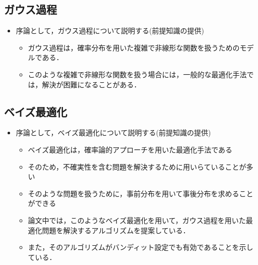 \documentclass[dvipdfmx, 10.5pt]{beamer}
\begin{document}

\subsection{ガウス過程}
\begin{frame}{\insertsubsection}
	\begin{itemize}
		\item 序論として，ガウス過程について説明する(前提知識の提供)
		\begin{itemize}
			\item ガウス過程は，確率分布を用いた複雑で非線形な関数を扱うためのモデルである．
			\item このような複雑で非線形な関数を扱う場合には，一般的な最適化手法では，解決が困難になることがある．
		\end{itemize}
	\end{itemize}


\end{frame}
\subsection{ベイズ最適化}
\begin{frame}{\insertsubsection}
	\begin{itemize}
		\item 序論として，ベイズ最適化について説明する(前提知識の提供)
		\begin{itemize}
			\item ベイズ最適化は，確率論的アプローチを用いた最適化手法である
			\item そのため，不確実性を含む問題を解決するために用いらていることが多い
			\item そのような問題を扱うために，事前分布を用いて事後分布を求めることができる
			\item 論文中では，このようなベイズ最適化を用いて，ガウス過程を用いた最適化問題を解決するアルゴリズムを提案している．
			\item また，そのアルゴリズムがバンディット設定でも有効であることを示している．
		\end{itemize}
	\end{itemize}

\end{frame}

\end{document}
